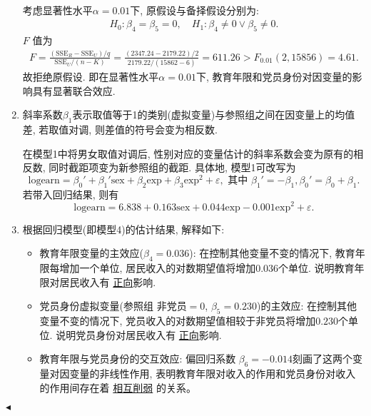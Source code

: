 \documentclass[11pt]{article}
\newenvironment{problem}[2][Problem]{\begin{trivlist}
\item[\hskip \labelsep {\bfseries #1}\hskip \labelsep {\bfseries #2.}]\songti}{\hfill$\blacktriangleleft$\end{trivlist}}
\newcommand\1{\mathds{1}}
\begin{document}
\begin{problem}{1}
\begin{enumerate}[label=(\arabic*)]
\begin{align*}
    \end{align*}
    考虑显著性水平$\alpha=0.01$下, 原假设与备择假设分别为:
    \begin{align*}
        H_0: \beta_4 = \beta_5 = 0, \quad H_1: \beta_4 \neq 0 \lor \beta_5 \neq 0.
    \end{align*} 
    $F$ 值为 
    \begin{align*}
        F = \frac{(\text{SSE}_R - \text{SSE}_U)/q}{\text{SSE}_U/(n-K)} = \frac{(2347.24-2179.22)/2}{2179.22/(15862 - 6)} = 611.26 > F_{0.01}(2, 15856) = 4.61.
    \end{align*}
    故拒绝原假设. 即在显著性水平$\alpha=0.01$下, 教育年限和党员身份对因变量的影响具有显著联合效应.
    \item  斜率系数$\beta_1$表示取值等于1的类别(虚拟变量)与参照组之间在因变量上的均值差, 若取值对调, 则差值的符号会变为相反数. 

    在模型1中将男女取值对调后, 性别对应的变量估计的斜率系数会变为原有的相反数, 同时截距项变为新参照组的截距. 具体地, 模型1可改写为
    \[
    \text{logearn} = \beta_0' + \beta_1' \text{sex} + \beta_2 \text{exp} + \beta_3 \text{exp}^2 + \varepsilon, \text{ 其中 } \beta_1' = -\beta_1, \beta_0' = \beta_0 + \beta_1.
    \]
    若带入回归结果, 则有
    \[
    \text{logearn} = 6.838 + 0.163 \text{sex} +  0.044 \text{exp} - 0.001 \text{exp}^2 + \varepsilon.
    \]
    \item 根据回归模型(即模型4)的估计结果, 解释如下:
    \begin{itemize}
        \item {\kaishu 教育年限变量的主效应($\beta_4 = 0.036$):} 在控制其他变量不变的情况下, 教育年限每增加一个单位, 居民收入的对数期望值将增加$0.036$个单位. 说明教育年限对居民收入有 \underline{正向}影响.
        \item {\kaishu 党员身份虚拟变量(参照组 $\text{非党员}=0$, $\beta_5 = 0.230$)的主效应:} 在控制其他变量不变的情况下, 党员收入的对数期望值相较于非党员将增加$0.230$个单位. 说明党员身份对居民收入有 \underline{正向}影响.
        \item {\kaishu 教育年限与党员身份的交互效应:} 偏回归系数 $\beta_6 = -0.014$刻画了这两个变量对因变量的非线性作用, 表明教育年限对收入的作用和党员身份对收入的作用间存在着 \underline{相互削弱} 的关系。
    \end{itemize}
\end{enumerate}

\end{problem}
\end{document}
